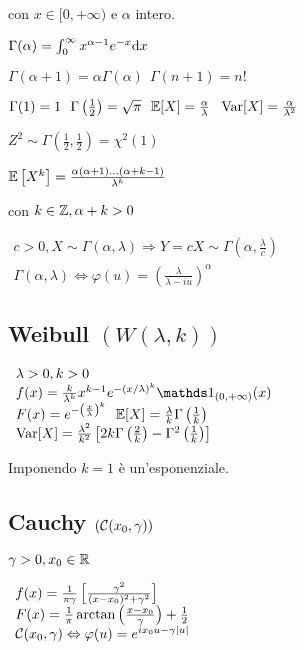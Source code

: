 con $x\in [0,+\infty )$ e $\alpha $ intero.

$\Gamma (\alpha )=\int^{\infty}_0 x^{\alpha -1} e^{-x}\mathrm d x$

$\Gamma (\alpha +1)=\alpha \Gamma (\alpha )\ \ \Gamma (n+1)=n!$

$\Gamma (1)=1\ \ \Gamma \left(\frac{1}{2}\right) =\sqrt{\pi} \ \ \EE[X]=\frac{\alpha}{\lambda} \ \ \Var[X]=\frac{\alpha}{\lambda^2}$

$Z^2 \sim \Gamma \left(\frac{1}{2} ,\frac{1}{2}\right) =\chi^2 (1)$

$\mathbb E\left[ X^k\right] =\frac{\alpha (\alpha +1)\dotsc (\alpha +k-1)}{\lambda^k}$

con $k\in \mathbb Z ,\alpha +k >0$

$ \begin{array}{l}
c >0,X\sim \Gamma (\alpha ,\lambda )\Rightarrow Y=cX\sim \Gamma \left( \alpha ,\frac{\lambda}{c}\right)\\
\Gamma (\alpha ,\lambda )\Leftrightarrow \varphi (u)=\left(\frac{\lambda}{\lambda -iu}\right)^{\alpha}
\end{array}$
\subsection{Weibull $(W(\lambda ,k))$}

$ \begin{array}{l}
\lambda >0,k >0\\
f(x)=\frac{k}{\lambda^k} x^{k-1} e^{-(x/\lambda )^k}\Ind_{(0,+\infty )} (x)\\
F(x)=e^{-\left(\frac{x}{\lambda}\right)^k} \ \ \EE[X]=\frac{\lambda}{k} \Gamma \left(\frac{1}{k}\right)\\
\Var[X]=\frac{\lambda^2}{k^2}\left[ 2k\Gamma \left(\frac{2}{k}\right) -\Gamma^2\left(\frac{1}{k}\right)\right]
\end{array}$

Imponendo $k=1$ è un'esponenziale.

\subsection{Cauchy $(\mathcal C( x_0 ,\gamma ))$}

$\gamma >0,x_0 \in \mathbb R$

$ \begin{array}{l}
f(x)=\frac{1}{\pi \gamma}\left[\frac{\gamma^2}{( x-x_0)^2 +\gamma^2}\right]\\
F(x)=\frac{1}{\pi}\operatorname{arctan}\left(\frac{x-x_0}{\gamma}\right) +\frac{1}{2}\\
\mathcal C( x_0 ,\gamma ) \Leftrightarrow \varphi (u)=e^{ix_0 u-\gamma |u|}
\end{array}$

